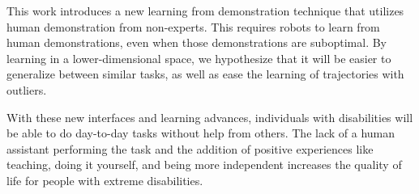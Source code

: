 \documentclass[letterpaper]{article}
\begin{document}

This work introduces a new learning from demonstration technique that utilizes human demonstration from non-experts. This requires robots to learn from human demonstrations, even when those demonstrations are suboptimal. By learning in a lower-dimensional space, we hypothesize that it will be easier to generalize between similar tasks, as well as ease the learning of trajectories with outliers.



With these new interfaces and learning advances, individuals with disabilities will be able to do day-to-day tasks without help from others. The lack of a human assistant performing the task and the addition of positive experiences like teaching, doing it yourself, and being more independent increases the quality of life for people with extreme disabilities.

\end{document}
